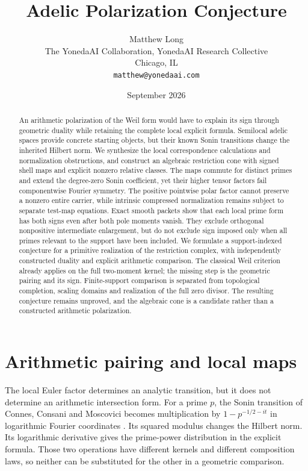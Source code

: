 \documentclass[11pt,letterpaper]{article}
\title{Adelic Polarization Conjecture}
\author{Matthew Long\\
 \small The YonedaAI Collaboration, YonedaAI Research Collective\\
 \small Chicago, IL\\
 \small \texttt{matthew@yonedaai.com}}
\date{September 2026}
\theoremstyle{definition}
\theoremstyle{remark}
\begin{document}
\maketitle
\begin{abstract}
An arithmetic polarization of the Weil form would have to explain its sign through geometric duality while retaining the complete local explicit formula. Semilocal adelic spaces provide concrete starting objects, but their known Sonin transitions change the inherited Hilbert norm. We synthesize the local correspondence calculations and normalization obstructions, and construct an algebraic restriction cone with signed shell maps and explicit nonzero relative classes. The maps commute for distinct primes and extend the degree-zero Sonin coefficient, yet their higher tensor factors fail componentwise Fourier symmetry. The positive pointwise polar factor cannot preserve a nonzero entire carrier, while intrinsic compressed normalization remains subject to separate test-map equations. Exact smooth packets show that each local prime form has both signs even after both pole moments vanish. They exclude orthogonal nonpositive intermediate enlargement, but do not exclude sign imposed only when all primes relevant to the support have been included. We formulate a support-indexed conjecture for a primitive realization of the restriction complex, with independently constructed duality and explicit arithmetic comparison. The classical Weil criterion already applies on the full two-moment kernel; the missing step is the geometric pairing and its sign. Finite-support comparison is separated from topological completion, scaling domains and realization of the full zero divisor. The resulting conjecture remains unproved, and the algebraic cone is a candidate rather than a constructed arithmetic polarization.
\end{abstract}

\section{Arithmetic pairing and local maps}

The local Euler factor determines an analytic transition, but it does not
determine an arithmetic intersection form. For a prime $p$, the Sonin
transition of Connes, Consani and Moscovici becomes multiplication by
$1-p^{-1/2-it}$ in logarithmic Fourier coordinates
\cite[Sections 4.5 to 4.8]{CCM}. Its squared modulus changes the Hilbert
norm. Its logarithmic derivative gives the prime-power distribution in
the explicit formula. Those two operations have different kernels and
different composition laws, so neither can be substituted for the other
in a geometric comparison.
\end{document}
